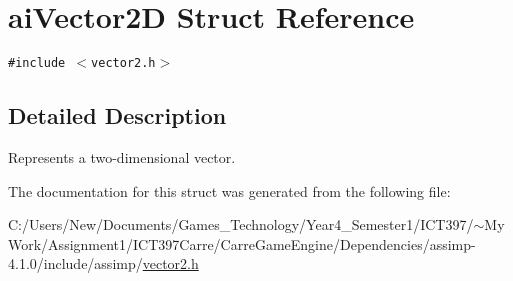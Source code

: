 \hypertarget{structai_vector2_d}{
\section{aiVector2D Struct Reference}
\label{structai_vector2_d}
}
{\tt \#include $<$vector2.h$>$}



\subsection{Detailed Description}
Represents a two-dimensional vector. 

The documentation for this struct was generated from the following file:\begin{CompactItemize}
\item 
C:/Users/New/Documents/Games\_\-Technology/Year4\_\-Semester1/ICT397/$\sim$My Work/Assignment1/ICT397Carre/CarreGameEngine/Dependencies/assimp-4.1.0/include/assimp/\hyperlink{vector2_8h}{vector2.h}\end{CompactItemize}
